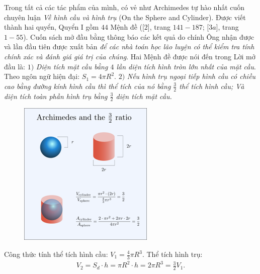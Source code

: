 \begin{multicols}{2}
	Trong tất cả các tác phẩm của mình, có vẻ như Archimedes tự hào nhất cuốn chuyên luận \textit{Về hình cầu và hình trụ} (On the Sphere and Cylinder). Được viết thành hai quyển, Quyển I gồm $44$ Mệnh đề ([$2$], trang $141-187$; [$3a$], trang $1-55$). Cuốn sách mở đầu bằng thông báo các kết quả do chính Ông nhận được và lần đầu tiên được xuất bản \textit{để các nhà toán học lão luyện có thể kiểm tra tính chính xác và đánh giá giá trị của chúng}. Hai Mệnh đề được nói đến trong Lời mở đầu là:
	\vskip 0.1cm
	$1)$ \textit{Diện tích mặt cầu bằng $4$ lần diện tích hình tròn lớn nhất của mặt cầu}.
	\vskip 0.1cm
	Theo ngôn ngữ hiện đại: $S_1 = 4\pi R^2$.
	\vskip 0.1cm
	$2)$ \textit{Nếu hình trụ ngoại tiếp hình cầu có chiều cao bằng đường kính hình cầu thì thể tích của nó bằng $\frac{3}{2}$ thể tích hình cầu; Và diện tích toàn phần hình trụ bằng $\frac{3}{2}$ diện tích mặt cầu.}  
	\begin{figure}[H]
		\vspace*{-5pt}
		\centering
		\captionsetup{labelformat= empty, justification=centering}
		\includegraphics[width= 0.8\linewidth]{6}
		\vspace*{-10pt}
	\end{figure}
	Công thức tính thể tích hình cầu:  ${V_1} = \frac{4}{3}\pi {R^3}$.
	\vskip 0.1cm
	Thể tích hình trụ: 
	\begin{align*}
		{V_2} = {S_d} \cdot h = \pi {R^2} \cdot h = 2\pi {R^3} = \frac{3}{2}{V_1}.
	\end{align*}

\end{multicols}
